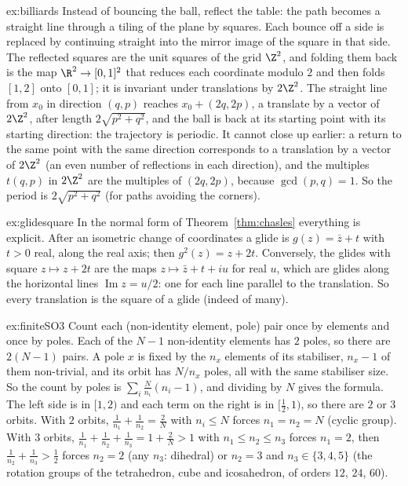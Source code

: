 \begin{solution}{ex:billiards}
\idea Instead of bouncing the ball, reflect the table: the path becomes a straight line through a tiling of the plane by squares.
\writeup Each bounce off a side is replaced by continuing straight into the mirror image of the square in that side. The reflected squares are
the unit squares of the grid $\Z^2$, and folding them back is the map $\R^2\to[0,1]^2$ that reduces each coordinate modulo $2$ and then
folds $[1,2]$ onto $[0,1]$; it is invariant under translations by $2\Z^2$. The straight line from $x_0$ in direction $(q,p)$ reaches
$x_0+(2q,2p)$, a translate by a vector of $2\Z^2$, after length $2\sqrt{p^2+q^2}$, and the ball is back at its starting point with its
starting direction: the trajectory is periodic. It cannot close up earlier: a return to the same point with the same direction
corresponds to a translation by a vector of $2\Z^2$ (an even number of reflections in each direction), and the multiples $t(q,p)$ in
$2\Z^2$ are the multiples of $(2q,2p)$, because $\gcd(p,q)=1$. So the period is $2\sqrt{p^2+q^2}$ (for paths avoiding the corners).
\end{solution}

\begin{solution}{ex:glidesquare}
\idea In the normal form of Theorem~\ref{thm:chasles} everything is explicit.
\writeup After an isometric change of coordinates a glide is $g(z)=\bar z+t$ with $t>0$ real, along the real axis; then
$g^2(z)=z+2t$. Conversely, the glides with square $z\mapsto z+2t$ are the maps $z\mapsto\bar z+t+iu$ for real $u$, which are glides along the
horizontal lines $\operatorname{Im}z=u/2$: one for each line parallel to the translation. So every translation is the square of a glide
(indeed of many).
\end{solution}

\begin{solution}{ex:finiteSO3}
\idea Count each (non-identity element, pole) pair once by elements and once by poles.
\writeup Each of the $N-1$ non-identity elements has $2$ poles, so there are $2(N-1)$ pairs. A pole $x$ is fixed by the $n_x$ elements of its
stabiliser, $n_x-1$ of them non-trivial, and its orbit has $N/n_x$ poles, all with the same stabiliser size. So the count by poles is
$\sum_i\frac N{n_i}(n_i-1)$, and dividing by $N$ gives the formula. The left side is in $[1,2)$ and each term on the right is in $[\frac12,1)$,
so there are $2$ or $3$ orbits. With $2$ orbits, $\frac1{n_1}+\frac1{n_2}=\frac2N$ with $n_i\le N$ forces $n_1=n_2=N$ (cyclic group). With $3$
orbits, $\frac1{n_1}+\frac1{n_2}+\frac1{n_3}=1+\frac2N>1$ with $n_1\le n_2\le n_3$ forces $n_1=2$, then $\frac1{n_2}+\frac1{n_3}>\frac12$ forces
$n_2=2$ (any $n_3$: dihedral) or $n_2=3$ and $n_3\in\{3,4,5\}$ (the rotation groups of the tetrahedron, cube and icosahedron, of orders
$12$, $24$, $60$).
\end{solution}

